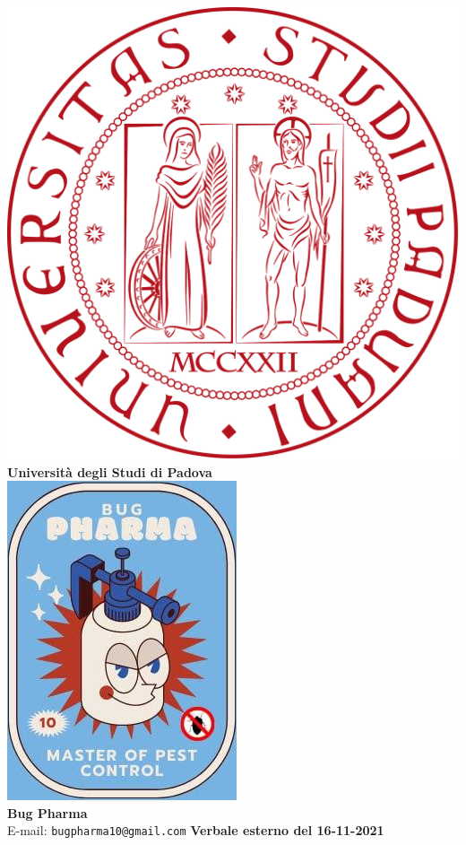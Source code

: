 \documentclass[11pt]{article}
\begin{document}
	\thispagestyle{empty}
	\begin{titlepage}
		\begin{center}
			\includegraphics[scale = 0.05]{../../logo_unipd.png}\\
			\large \textbf{Università degli Studi di Padova} \\
			\vfill
			\includegraphics[scale = 0.7]{../../logo_small.jpg}\\
			\large \textbf{Bug Pharma} \\
			\vfill
			\large
			E-mail: 
			\texttt{bugpharma10@gmail.com}
			\vfill
			\Huge \textbf{Verbale esterno del 16-11-2021}\\
			

\end{center}
\end{titlepage}
\end{document}
